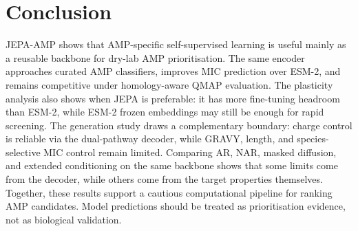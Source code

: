 \section{Conclusion}

JEPA-AMP shows that AMP-specific self-supervised learning is useful mainly as a
reusable backbone for dry-lab AMP prioritisation.
The same encoder approaches curated AMP classifiers, improves MIC prediction
over ESM-2, and remains competitive under homology-aware QMAP evaluation.
The plasticity analysis also shows when JEPA is preferable:
it has more fine-tuning headroom than ESM-2, while ESM-2 frozen embeddings
may still be enough for rapid screening.
The generation study draws a complementary boundary: charge control is reliable
via the dual-pathway decoder, while GRAVY, length, and species-selective MIC
control remain limited.
Comparing AR, NAR, masked diffusion, and extended conditioning on the same
backbone shows that some limits come from the decoder, while others come from
the target properties themselves.
Together, these results support a cautious computational pipeline for ranking
AMP candidates.
Model predictions should be treated as prioritisation evidence, not as
biological validation.



